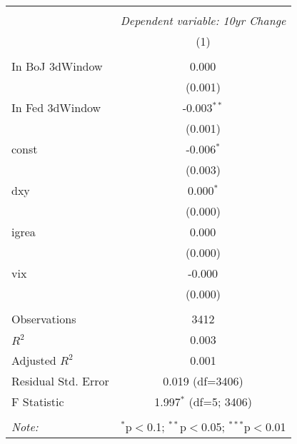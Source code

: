 \begin{table}[!htbp] \centering
\begin{tabular}{@{\extracolsep{5pt}}lc}
\\[-1.8ex]\hline
\hline \\[-1.8ex]
& \multicolumn{1}{c}{\textit{Dependent variable: 10yr Change}} \
\cr \cline{2-2}
\\[-1.8ex] & (1) \\
\hline \\[-1.8ex]
 In BoJ 3dWindow & 0.000$^{}$ \\
& (0.001) \\
 In Fed 3dWindow & -0.003$^{**}$ \\
& (0.001) \\
 const & -0.006$^{*}$ \\
& (0.003) \\
 dxy & 0.000$^{*}$ \\
& (0.000) \\
 igrea & 0.000$^{}$ \\
& (0.000) \\
 vix & -0.000$^{}$ \\
& (0.000) \\
\hline \\[-1.8ex]
 Observations & 3412 \\
 $R^2$ & 0.003 \\
 Adjusted $R^2$ & 0.001 \\
 Residual Std. Error & 0.019 (df=3406) \\
 F Statistic & 1.997$^{*}$ (df=5; 3406) \\
\hline
\hline \\[-1.8ex]
\textit{Note:} & \multicolumn{1}{r}{$^{*}$p$<$0.1; $^{**}$p$<$0.05; $^{***}$p$<$0.01} \\
\end{tabular}
\end{table}